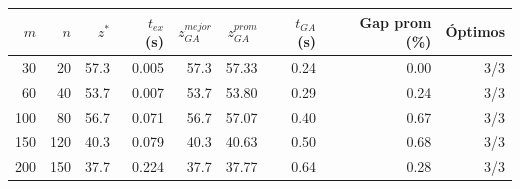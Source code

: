 \begin{tabular}{rrrrrrrrr}
\toprule
$m$ & $n$ & $z^*$ & $t_{ex}$ (s) & $z_{GA}^{mejor}$ & $z_{GA}^{prom}$ & $t_{GA}$ (s) & Gap prom (\%) & \'Optimos \\
\midrule
30 & 20 & 57.3 & 0.005 & 57.3 & 57.33 & 0.24 & 0.00 & 3/3 \\
60 & 40 & 53.7 & 0.007 & 53.7 & 53.80 & 0.29 & 0.24 & 3/3 \\
100 & 80 & 56.7 & 0.071 & 56.7 & 57.07 & 0.40 & 0.67 & 3/3 \\
150 & 120 & 40.3 & 0.079 & 40.3 & 40.63 & 0.50 & 0.68 & 3/3 \\
200 & 150 & 37.7 & 0.224 & 37.7 & 37.77 & 0.64 & 0.28 & 3/3 \\
\bottomrule
\end{tabular}